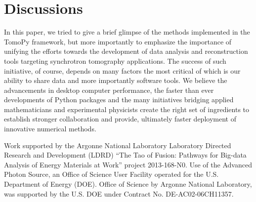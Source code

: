 \documentclass[pdf]{iucr}              %
\begin{document}


\section{Discussions}

In this paper, we tried to give a brief glimpse of the methods implemented in the TomoPy framework, but more importantly to emphasize the importance of unifying the efforts towards the development of data analysis and reconstruction tools targeting synchrotron tomography applications. The success of such initiative, of course, depends on many factors the most critical of which is our ability to share data and more importantly software tools. We believe the advancements in desktop computer performance, the faster than ever developments of Python packages and the many initiatives bridging applied mathematicians and experimental physicists create the right set of ingredients to establish stronger collaboration and provide, ultimately faster deployment of innovative numerical methods.





Work supported by the Argonne National Laboratory Laboratory Directed Research and Development (LDRD) ``The Tao of Fusion: Pathways for Big-data Analysis of Energy Materials at Work'' project 2013-168-N0. Use of the Advanced Photon Source, an Office of Science User Facility operated for the U.S. Department of Energy (DOE). Office of Science by Argonne National Laboratory, was supported by the U.S. DOE under Contract No. DE-AC02-06CH11357. 
\end{document}
